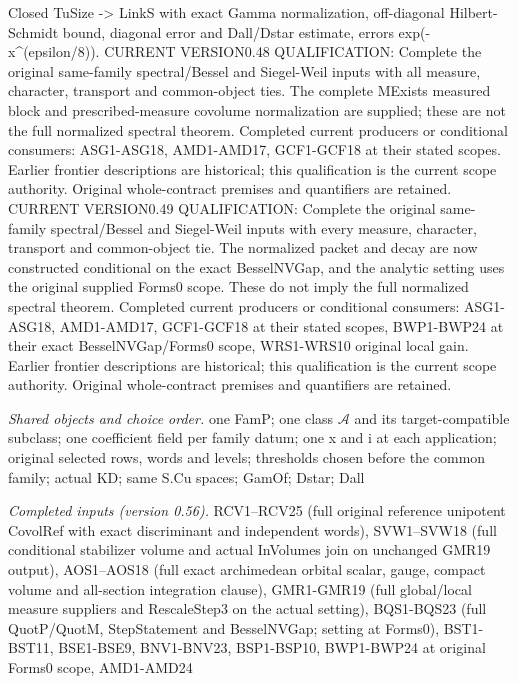 \documentclass[11pt,a4paper]{article}
\numberwithin{equation}{section}
\theoremstyle{remark}\newtheorem{remark}[theorem]{Remark}
\begin{document}
Closed TuSize -> LinkS with exact Gamma normalization, off-diagonal Hilbert-Schmidt bound, diagonal error and Dall/Dstar estimate, errors exp(-x\textasciicircum{}(epsilon/8)). CURRENT VERSION0.48 QUALIFICATION: Complete the original same-family spectral/Bessel and Siegel-Weil inputs with all measure, character, transport and common-object ties. The complete MExists measured block and prescribed-measure covolume normalization are supplied; these are not the full normalized spectral theorem. Completed current producers or conditional consumers: ASG1-ASG18, AMD1-AMD17, GCF1-GCF18 at their stated scopes. Earlier frontier descriptions are historical; this qualification is the current scope authority. Original whole-contract premises and quantifiers are retained. CURRENT VERSION0.49 QUALIFICATION: Complete the original same-family spectral/Bessel and Siegel-Weil inputs with every measure, character, transport and common-object tie. The normalized packet and decay are now constructed conditional on the exact BesselNVGap, and the analytic setting uses the original supplied Forms0 scope. These do not imply the full normalized spectral theorem. Completed current producers or conditional consumers: ASG1-ASG18, AMD1-AMD17, GCF1-GCF18 at their stated scopes, BWP1-BWP24 at their exact BesselNVGap/Forms0 scope, WRS1-WRS10 original local gain. Earlier frontier descriptions are historical; this qualification is the current scope authority. Original whole-contract premises and quantifiers are retained.

\emph{Shared objects and choice order.} one FamP; one class $\mathcal A$ and its target-compatible subclass; one coefficient field per family datum; one x and i at each application; original selected rows, words and levels; thresholds chosen before the common family; actual KD; same S.Cu spaces; GamOf; Dstar; Dall

\emph{Completed inputs (version 0.56).} RCV1–RCV25 (full original reference unipotent CovolRef with exact discriminant and independent words), SVW1–SVW18 (full conditional stabilizer volume and actual InVolumes join on unchanged GMR19 output), AOS1–AOS18 (full exact archimedean orbital scalar, gauge, compact volume and all-section integration clause), GMR1-GMR19 (full global/local measure suppliers and RescaleStep3 on the actual setting), BQS1-BQS23 (full QuotP/QuotM, StepStatement and BesselNVGap; setting at Forms0), BST1-BST11, BSE1-BSE9, BNV1-BNV23, BSP1-BSP10, BWP1-BWP24 at original Forms0 scope, AMD1-AMD24
\end{document}
